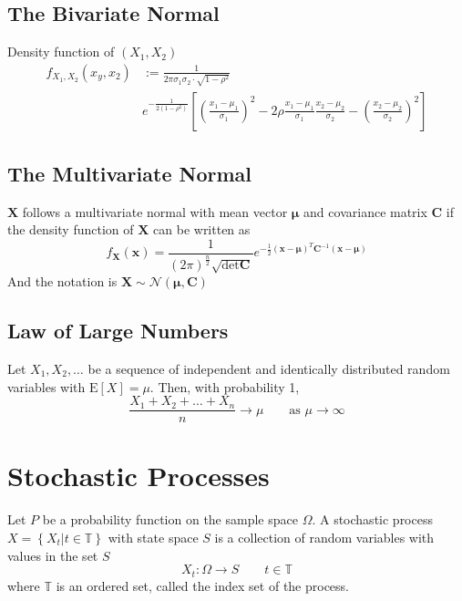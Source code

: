 \documentclass[11pt]{article}
\theoremstyle{definition}
\newcommand*\ev[1]{\mathrel{\text{E}\left[#1\right]}}
\begin{document}
\subsection{The Bivariate Normal}

Density function of $(X_1,X_2)$
\begin{align*}
	f_{X_1, X_2}(x_y,x_2) &:= \frac{1}{2\pi\sigma_1\sigma_2\cdot\sqrt{1-\rho^2}}\\
	& e^{-\frac{1}{2(1-\rho^2)}} \left[ \left(\frac{x_1 - \mu_1}{\sigma_1}\right)^2 - 2 \rho\frac{x_1 - \mu_1}{\sigma_1}\frac{x_2- \mu_2}{\sigma_2} - \left(\frac{x_2 - \mu_2}{\sigma_2}\right)^2 \right]
\end{align*}


\subsection{The Multivariate Normal}
$\textbf{X}$ follows a multivariate normal with mean vector $\bm{\mu}$ and covariance matrix $\textbf{C}$ if the density function of $\textbf{X}$ can be written as
\begin{equation*}
	f_{\textbf{X}}(\textbf{x}) = \frac{1}{(2\pi)^{\frac{n}{2}}\sqrt{\det \textbf{C}}} e^{- \frac{1}{2} (\textbf{x}-\bm{\mu})^T \textbf{C}^{-1}(\textbf{x}-\bm{\mu})}
\end{equation*}
And the notation is $\textbf{X}\sim \mathcal{N}(\bm{\mu}, \textbf{C})$

\subsection{Law of Large Numbers}
\begin{theorem}
	Let $X_1, X_2, \dots$ be a sequence of independent and identically distributed random variables with $\ev{X} = \mu$. Then, with probability 1,
	\begin{equation*}
		\frac{X_1 + X_2 + \dots + X_n}{n} \longrightarrow \mu \qquad\text{as }\mu\rightarrow\infty
	\end{equation*}
\end{theorem}


\section{Stochastic Processes}

\begin{definition}
	Let $P$ be a probability function on the sample space $\Omega$. A stochastic process $X = \left\{ X_t | t\in \mathbb{T} \right\}$ with state space $S$ is a collection of random variables with values in the set $S$
	\begin{equation*}
		X_t : \Omega \rightarrow S\qquad t\in\mathbb{T}
	\end{equation*}
	where $\mathbb{T}$ is an ordered set, called the index set of the process.
\end{definition}
\end{document}

